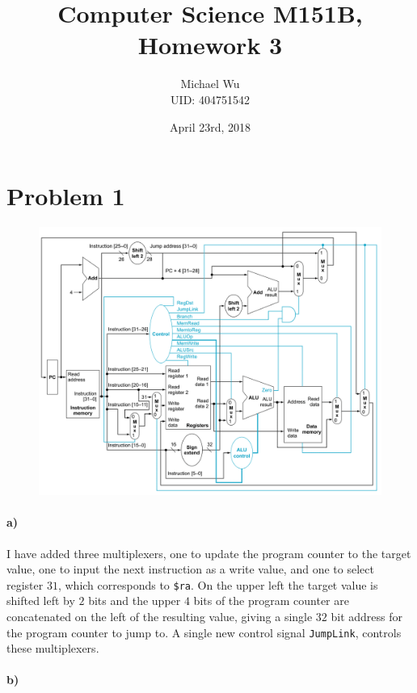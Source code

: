 \documentclass[12pt]{article}
\begin{document}
\title{Computer Science M151B, Homework 3}
\date{April 23rd, 2018}
\author{Michael Wu\\UID: 404751542}
\maketitle

\section*{Problem 1}

\begin{figure}[!ht]
    \begin{center}
        \includegraphics[width=4.8in]{problem1a.png}
    \end{center}
\end{figure}

\paragraph{a)}

I have added three multiplexers, one to update the program counter to the target value, one to input the next instruction as a write
value, and one to select register \(31\), which corresponds to \texttt{\$ra}. On the upper left the target value is shifted left by \(2\)
bits and the upper \(4\) bits of the program counter are concatenated on the left of the resulting value, giving a single \(32\) bit address
for the program counter to jump to. A single new control signal \texttt{JumpLink}, controls these multiplexers.

\paragraph{b)}
\end{document}
